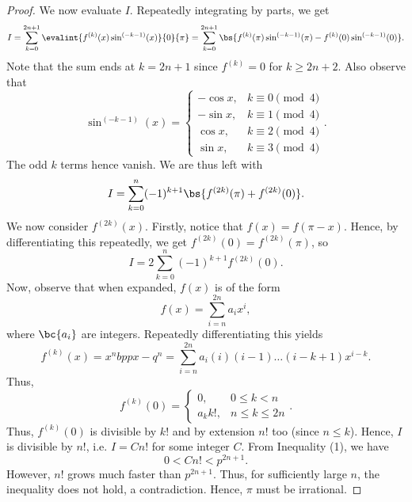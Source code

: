 \begin{proof}
    We now evaluate $I$. Repeatedly integrating by parts, we get \[I = \sum_{k = 0}^{2n+1} \evalint{f^{(k)}(x) \sin^{(-k-1)} (x)}{0}{\pi} = \sum_{k = 0}^{2n+1} \bs{f^{(k)}(\pi) \sin^{(-k-1)}(\pi) - f^{(k)}(0) \sin^{(-k-1)}(0)}.\] Note that the sum ends at $k = 2n+1$ since $f^{(k)} = 0$ for $k \geq 2n+2$. Also observe that \[\sin^{(-k-1)}(x) = \begin{cases}
        -\cos x, & k \equiv 0 \pmod{4}\\
        -\sin x, & k \equiv 1 \pmod{4}\\
        \cos x, & k \equiv 2 \pmod{4}\\
        \sin x, & k \equiv 3 \pmod{4}
    \end{cases}.\]
    The odd $k$ terms hence vanish. We are thus left with \[I = \sum_{k = 0}^{n} (-1)^{k+1} \bs{f^{(2k)}(\pi) + f^{(2k)}(0)}.\] We now consider $f^{(2k)}(x)$. Firstly, notice that $f(x) = f(\pi - x)$. Hence, by differentiating this repeatedly, we get $f^{(2k)}(0) = f^{(2k)}(\pi)$, so \[I = 2 \sum_{k = 0}^{n} (-1)^{k+1} f^{(2k)}(0).\] Now, observe that when expanded, $f(x)$ is of the form \[f(x) = \sum_{i = n}^{2n} a_i x^{i},\] where $\bc{a_i}$ are integers. Repeatedly differentiating this yields \[f^{(k)}(x) = x^n bp{px - q}^n = \sum_{i = n}^{2n} a_i (i)(i-1)\dots(i-k+1) x^{i - k}.\] Thus, \[f^{(k)}(0) = \begin{cases}
        0, & 0 \leq k < n\\
        a_k k!, & n \leq k \leq 2n
    \end{cases}.\]
    Thus, $f^{(k)}(0)$ is divisible by $k!$ and by extension $n!$ too (since $n \leq k$). Hence, $I$ is divisible by $n!$, i.e. $I = Cn!$ for some integer $C$. From Inequality (1), we have \[0 < C n! < p^{2n+1}.\] However, $n!$ grows much faster than $p^{2n+1}$. Thus, for sufficiently large $n$, the inequality does not hold, a contradiction. Hence, $\pi$ must be irrational.
\end{proof}

